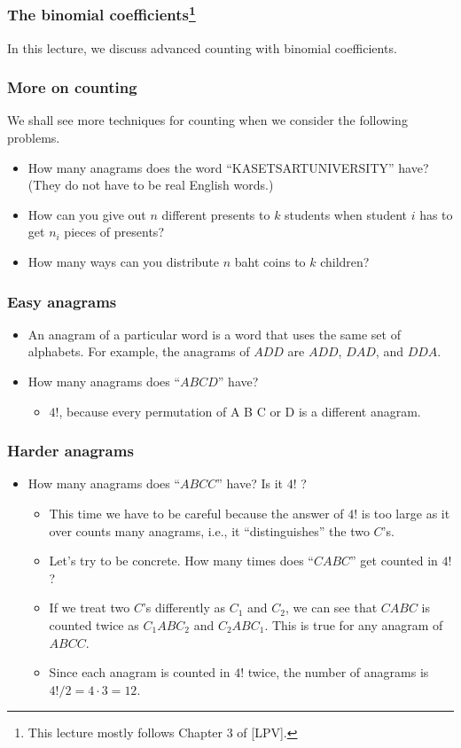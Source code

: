 

\begin{frame}\frametitle{The binomial coefficients\footnote{This lecture mostly follows Chapter 3 of [LPV].}}
  In this lecture, we discuss advanced counting with binomial
  coefficients.
\end{frame}

\begin{frame}\frametitle{More on counting}
  We shall see more techniques for counting when we consider the
  following problems.
  \begin{itemize}
  \item How many anagrams does the word ``KASETSARTUNIVERSITY'' have?
    (They do not have to be real English words.)
  \item How can you give out $n$ different presents to $k$ students
    when student $i$ has to get $n_i$ pieces of presents?
  \item How many ways can you distribute $n$ baht coins to $k$
    children?
  \end{itemize}
\end{frame}

\begin{frame}\frametitle{Easy anagrams}
  \begin{itemize}
  \item An anagram of a particular word is a word that uses the same
    set of alphabets.  For example, the anagrams of $ADD$ are $ADD$,
    $DAD$, and $DDA$. \pause
  \item How many anagrams does ``$ABCD$'' have? \pause
    \begin{itemize}
    \item $4!$, because every permutation of A B C or D is a different
      anagram. \pause
    \end{itemize}
  \end{itemize}
\end{frame}

\begin{frame}\frametitle{Harder anagrams}
  \begin{itemize}
  \item How many anagrams does ``$ABCC$'' have? Is it $4!$ ? \pause
    \begin{itemize}
    \item This time we have to be careful because the answer of $4!$
      is too large as it over counts many anagrams, i.e., it
      ``distinguishes'' the two $C$'s. \pause
    \item Let's try to be concrete. How many times does ``$CABC$'' get
      counted in $4!$? \pause
    \item If we treat two $C$'s differently as $C_1$ and $C_2$, we can
      see that $CABC$ is counted twice as $C_1ABC_2$ and $C_2ABC_1$.
      This is true for any anagram of $ABCC$.  \pause
    \item Since each anagram is counted in $4!$ twice, the number of
      anagrams is $4! / 2 = 4\cdot 3 = 12$.
    \end{itemize}
  \end{itemize}
\end{frame}

